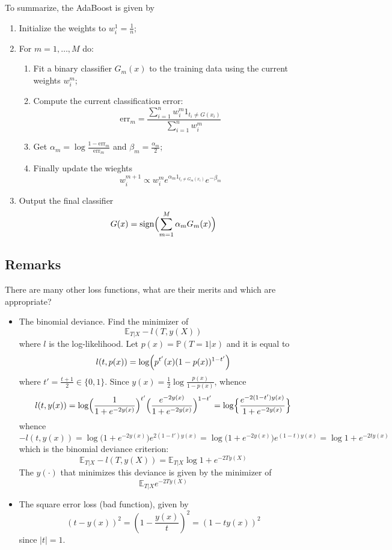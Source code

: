 \documentclass[a4paper]{article}
\newcommand{\ex}{\mathbb{E}}
\newcommand{\pr}[0]{{\mathbb{P}}}
\begin{document}
To summarize, the AdaBoost is given by
\begin{enumerate}
	\item Initialize the weights to $w^1_i = \frac{1}{n}$;
	\item For $m=1,\ldots, M$ do: \begin{enumerate}
		\item Fit a binary classifier $G_m(x)$ to the training data using the current
		weights $w^m_i$;
		\item Compute the current classification error:
		\[ \text{err}_m = \frac{\sum_{i=1}^n w^m_i 1_{t_i \neq G(x_i)}}{\sum_{i=1}^n w^m_i} \]
		\item Get $\alpha_m = \log\frac{1-\text{err}_m}{\text{err}_m}$ and
			$\beta_m = \frac{\alpha_m}{2}$;
		\item Finally update the wieghts
		\[ w^{m+1}_i \propto w^m_i e^{\alpha_m 1_{t_i \neq G_m(x_i)}} e^{-\beta_m} \]
	\end{enumerate}
	\item Output the final classifier 
		\[G(x) = \text{sign} \Bigl( \sum_{m=1}^M \alpha_m G_m(x) \Bigr)\]
\end{enumerate}


\subsection{Remarks} %
\label{sub:remarks}

There are many other loss functions, what are their merits and which are appropriate?
\begin{itemize}
	\item The binomial deviance. Find the minimizer of
	\[\ex_{T|X} -l( T, y(X))\]
	where $l$ is the log-likelihood. Let $p(x) = \pr(T=1|x)$ and it is equal to
	\[l(t, p(x)) = \log\Bigl( p^{t'}(x) (1-p(x))^{1-t'} \Bigr)\]
	where $t' = \frac{t+1}{2}\in \{ 0,1\}$.
	Since $y(x) = \frac{1}{2}\log\frac{p(x)}{1-p(x)}$, whence
	\[
	l(t, y(x))
	= \log\Bigl( \frac{1}{1+e^{-2y(x)}}\Bigr)^{t'} \Bigl( \frac{e^{-2y(x)}}{1+e^{-2y(x)}}\Bigr)^{1-t'}
	= \log\Bigl\{ \frac{e^{-2(1-t')y(x)}}{1+e^{-2y(x)}}\Bigr\}
	\]
	whence
	\[
	-l(t,y(x))
	= \log\bigl( 1+e^{-2y(x)}\bigr) e^{2(1-t')y(x)}
	= \log\bigl( 1+e^{-2y(x)}\bigr) e^{(1-t)y(x)}
	= \log 1+e^{-2 t y(x)}
	\]
	which is the binomial deviance criterion:
	\[
	\ex_{T|X} -l( T, y(X))
	= \ex_{T|X} \log 1+e^{-2 T y(X)}
	\]
	The $y(\cdot)$ that minimizes this deviance is given by the minimizer of 
	\[\ex_{T|X} e^{-2 T y(X)}\]
	\item The square error loss (bad function), given by
	\[(t-y(x))^2 = (1-\frac{y(x)}{t})^2  = (1 - t y(x))^2 \]
	since $|t|=1$.
\end{itemize}
\end{document}
